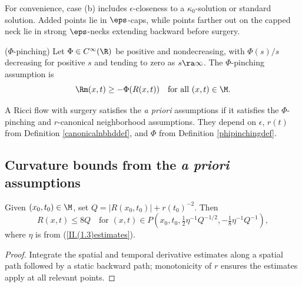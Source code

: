 \begin{remark}
  \label{rem:kl-priori-assumptions-continuation-kappa-solutions}
For convenience, case (b) includes $\epsilon$-closeness to a
$\kappa_0$-solution or standard solution. Added points lie in $\eps$-caps,
while points farther out on the capped neck lie in strong $\eps$-necks
extending backward before surgery.
\end{remark}

\begin{definition}
  \label{def:kl-priori-assumptions-curvature-pinching-assumption}
\label{phipinchingdef}
($\Phi$-pinching) Let $\Phi\in C^\infty(\R)$ be positive and nondecreasing,
with $\Phi(s)/s$ decreasing for positive $s$ and tending to zero as
$s\ra\infty$. The $\Phi$-pinching assumption is
\[
\Rm(x,t)\geq-\Phi(R(x,t))\quad\text{for all }(x,t)\in\M.
\]
\end{definition}

\begin{definition}
  \label{def:kl-priori-assumptions-surgery-priori-assumptions}
 \label{apriori}
A Ricci flow with surgery satisfies the \emph{a priori} assumptions if it
satisfies the $\Phi$-pinching and $r$-canonical neighborhood assumptions.
They depend on $\epsilon$, $r(t)$ from Definition \ref{canonicalnbhddef},
and $\Phi$ from Definition \ref{phipinchingdef}.
\end{definition}

\subsection{Curvature bounds from the \emph{a priori} assumptions}

\begin{lemma}
  \label{lem:kl-curvature-bounds-from-priori-assumptions-estimates-curvature}
\label{claim1II.4.2}
Given $(x_0,t_0)\in\M$, set $Q=|R(x_0,t_0)|+r(t_0)^{-2}$. Then
\[
R(x,t)\leq8Q\quad\text{for }(x,t)\in
P\left(x_0,t_0,\tfrac12\eta^{-1}Q^{-1/2},-\tfrac18\eta^{-1}Q^{-1}\right),
\]
where $\eta$ is from (\ref{II.(1.3)estimates}).
\end{lemma}
\begin{proof}
\sketch Integrate the spatial and temporal derivative estimates along a
spatial path followed by a static backward path; monotonicity of $r$ ensures
the estimates apply at all relevant points.
\end{proof}

